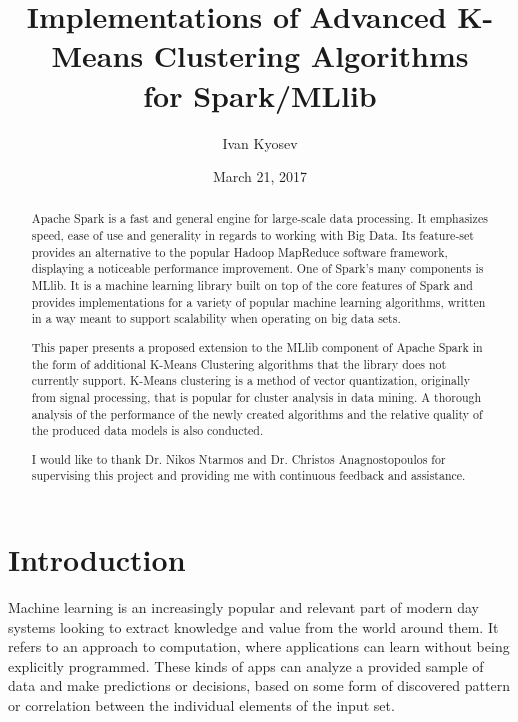 \documentclass{l4proj}
\begin{document}
\title{Implementations of Advanced K-Means Clustering Algorithms \\ for Spark/MLlib}
\author{Ivan Kyosev}
\date{March 21, 2017}
\maketitle

\begin{abstract}
Apache Spark is a fast and general engine for large-scale data processing. It emphasizes speed, ease of use and generality in regards to working with Big Data. Its feature-set provides an alternative to the popular Hadoop MapReduce software framework, displaying a noticeable performance improvement. One of Spark's many components is MLlib. It is a machine learning library built on top of the core features of Spark and provides implementations for a variety of popular machine learning algorithms, written in a way meant to support scalability when operating on big data sets.

This paper presents a proposed extension to the MLlib component of Apache Spark in the form of additional K-Means Clustering algorithms that the library does not currently support. K-Means clustering is a method of vector quantization, originally from signal processing, that is popular for cluster analysis in data mining. A thorough analysis of the performance of the newly created algorithms and the relative quality of the produced data models is also conducted.
\end{abstract}

\renewcommand{\abstractname}{Acknowledgements}
\begin{abstract}
I would like to thank Dr. Nikos Ntarmos and Dr. Christos Anagnostopoulos for supervising this project and providing me with continuous feedback and assistance.
\end{abstract}

\educationalconsent

\tableofcontents

\chapter{Introduction}
\label{intro}

Machine learning is an increasingly popular and relevant part of modern day systems looking to extract knowledge and value from the world around them. It refers to an approach to computation, where applications can learn without being explicitly programmed. These kinds of apps can analyze a provided sample of data and make predictions or decisions, based on some form of discovered pattern or correlation between the individual elements of the input set.
\end{document}
